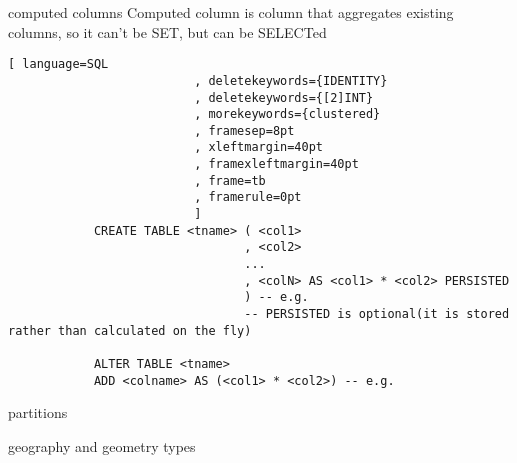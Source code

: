\documentclass{article}
\begin{document}
    \begin{section}{computed columns}
        Computed column is column that aggregates existing columns, so it can't be SET, but can be SELECTed
        \begin{lstlisting}[ language=SQL
                          , deletekeywords={IDENTITY}
                          , deletekeywords={[2]INT}
                          , morekeywords={clustered}
                          , framesep=8pt
                          , xleftmargin=40pt
                          , framexleftmargin=40pt
                          , frame=tb
                          , framerule=0pt 
                          ]
            CREATE TABLE <tname> ( <col1>
                                 , <col2>
                                 ...
                                 , <colN> AS <col1> * <col2> PERSISTED
                                 ) -- e.g.
                                 -- PERSISTED is optional(it is stored rather than calculated on the fly)

            ALTER TABLE <tname>
            ADD <colname> AS (<col1> * <col2>) -- e.g.
        \end{lstlisting}
    \end{section}
    \begin{section}{partitions}
        
    \end{section}
    \begin{section}{geography and geometry types}
    
    \end{section}
\end{document}
